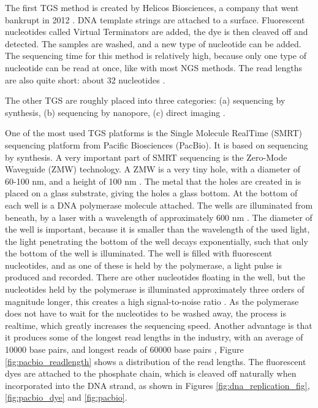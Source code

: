 \documentclass[../main/thesis.tex]{subfiles}
\begin{document}
The first TGS method is created by Helicos Biosciences, a company that went bankrupt in 2012 \cite{history_sequencing}.
DNA template strings are attached to a surface.
Fluorescent nucleotides called Virtual Terminators are added, the dye is then cleaved off and detected.
The samples are washed, and a new type of nucleotide can be added.
The sequencing time for this method is relatively high, because only one type of nucleotide can be read at once, like with most NGS methods.
The read lengths are also quite short: about 32 nucleotides \cite{window_tgs}.

The other TGS are roughly placed into three categories: (a) sequencing by synthesis, (b) sequencing by nanopore, (c) direct imaging \cite{window_tgs}.

One of the most used TGS platforms is the Single Molecule RealTime (SMRT) sequencing platform from Pacific Biosciences (PacBio).
It is based on sequencing by synthesis.
A very important part of SMRT sequencing is the Zero-Mode Waveguide (ZMW) technology.
A ZMW is a very tiny hole, with a diameter of 60-100 nm, and a height of 100 nm \cite{zmw}.
The metal that the holes are created in is placed on a glass substrate, giving the holes a glass bottom.
At the bottom of each well is a DNA polymerase molecule attached.
The wells are illuminated from beneath, by a laser with a wavelength of approximately 600 nm \cite{history_sequencing}.
The diameter of the well is important, because it is smaller than the wavelength of the used light, the light penetrating the bottom of the well decays exponentially, such that only the bottom of the well is illuminated.
The well is filled with fluorescent nucleotides, and as one of these is held by the polymerase, a light pulse is produced and recorded.
There are other nucleotides floating in the well, but the nucleotides held by the polymerase is illuminated approximately three orders of magnitude longer, this creates a high signal-to-noise ratio \cite{window_tgs}.
As the polymerase does not have to wait for the nucleotides to be washed away, the process is realtime, which greatly increases the sequencing speed.
Another advantage is that it produces some of the longest read lengths in the industry, with an average of 10000 base pairs, and longest reads of 60000 base pairs \cite{pacbio_readlength}, Figure \ref{fig:pacbio_readlength} shows a distribution of the read lengths.
The fluorescent dyes are attached to the phosphate chain, which is cleaved off naturally when incorporated into the DNA strand, as shown in Figures \ref{fig:dna_replication_fig}, \ref{fig:pacbio_dye} and \ref{fig:pacbio}.
\end{document}
